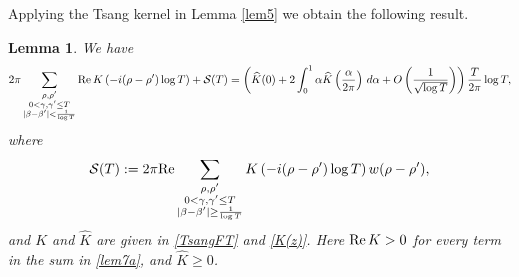 \documentclass{amsart}
\newcommand{\1}{\mathbbm{1}}
\newtheorem{lem}{Lemma}
\theoremstyle{remark}
\numberwithin{equation}{section}
\begin{document}
Applying the Tsang kernel in Lemma \ref{lem5} we obtain the following result. 
\begin{lem}\label{lem7} We have
\begin{equation}\label{lem7a} 2\pi \sum_{\substack{\rho, \rho' \\ 0<\gamma,\gamma'\le T\\ |\beta-\beta'|<\frac1{\log T}}} 
{\rm Re}\,K\left(-i(\rho -\rho')\log{T}\right) + \mathcal{S}(T)=
\left(\widehat{K}(0) + 2\int_0^1 \alpha\widehat{K}\left(\frac{\alpha}{2\pi}\right)\, d\alpha + O\left(\frac1{\sqrt{\log T}}\right)\right)\frac{T}{2\pi}\log T,
\end{equation}
where
\begin{equation}\label{lem7b} \mathcal{S}(T) := 2\pi {\rm Re}\sum_{\substack{\rho, \rho' \\ 0<\gamma,\gamma'\le T\\ |\beta-\beta'| \ge \frac1{\log T}}} K\left(-i(\rho -\rho')\log{T}\right)w(\rho-\rho') ,
\end{equation}
and $K$ and $\widehat K$ are given in \eqref{TsangFT} and \eqref{K(z)}. Here ${\rm Re}\,K> 0$ for every term in the sum in \eqref{lem7a}, and $\widehat{K}\ge 0$.
\end{lem}
\end{document}

